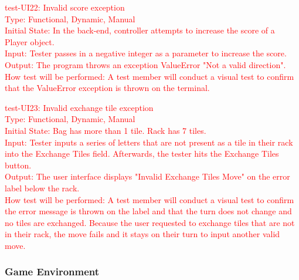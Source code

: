 \documentclass[12pt, titlepage]{article}
\begin{document}
\begin{enumerate}
    \textcolor{red}{\item test-UI22: Invalid score exception\\
    Type: Functional, Dynamic, Manual\\
    Initial State: In the back-end, controller attempts to increase the score of a Player object. \\
    Input: Tester passes in a negative integer as a parameter to increase the score.\\
    Output: The program throws an exception ValueError "Not a valid direction".\\
    How test will be performed: A test member will conduct a visual test to confirm that the ValueError exception is thrown on the terminal.}
    
    \textcolor{red}{\item test-UI23: Invalid exchange tile exception\\
    Type: Functional, Dynamic, Manual\\
    Initial State: Bag has more than 1 tile. Rack has 7 tiles. \\
    Input: Tester inputs a series of letters that are not present as a tile in their rack into the Exchange Tiles field. Afterwards, the tester hits the Exchange Tiles button.\\
    Output: The user interface displays "Invalid Exchange Tiles Move" on the error label below the rack.\\
    How test will be performed: A test member will conduct a visual test to confirm the error message is thrown on the label and that the turn does not change and no tiles are exchanged. Because the user requested to exchange tiles that are not in their rack, the move fails and it stays on their turn to input another valid move.}
    
\end{enumerate}
\subsubsection{Game Environment}
\end{document}

